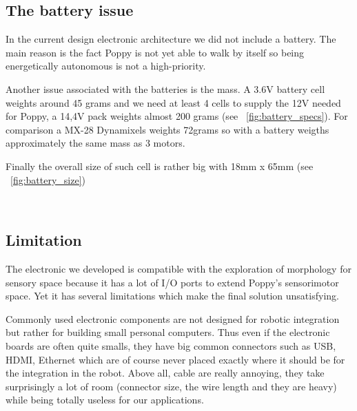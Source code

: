 \subsection{The battery issue} %
In the current design electronic architecture we did not include a battery. The main reason is the fact Poppy is not yet able to walk by itself so being energetically autonomous is not a high-priority.

Another issue associated with the batteries is the mass. A 3.6V battery cell weights around 45 grams and we need at least 4 cells to supply the 12V needed for Poppy, a 14,4V pack weights almost 200 grams (see \figurename~\ref{fig:battery_specs}). For comparison a MX-28 Dynamixels weights 72grams so with a battery weigths approximately the same mass as 3 motors.

Finally the overall size of such cell is rather big with 18mm x 65mm (see \figurename~\ref{fig:battery_size})

\begin{figure}[]
\centering
    \hfil
    \\
    \caption{}
    \label{fig:tyva_batteries}
\end{figure}





\subsection{Limitation} %

The electronic we developed is compatible with the exploration of morphology for sensory space because it has a lot of I/O ports to extend Poppy's sensorimotor space. Yet it has several limitations which make the final solution unsatisfying.

Commonly used electronic components are not designed for robotic integration but rather for building small personal computers. Thus even if the electronic boards are often quite smalls, they have big common connectors such as USB, HDMI, Ethernet which are of course never placed exactly where it should be for the integration in the robot.
Above all, cable are really annoying, they take surprisingly a lot of room (connector size, the wire length and they are heavy) while being totally useless for our applications.

